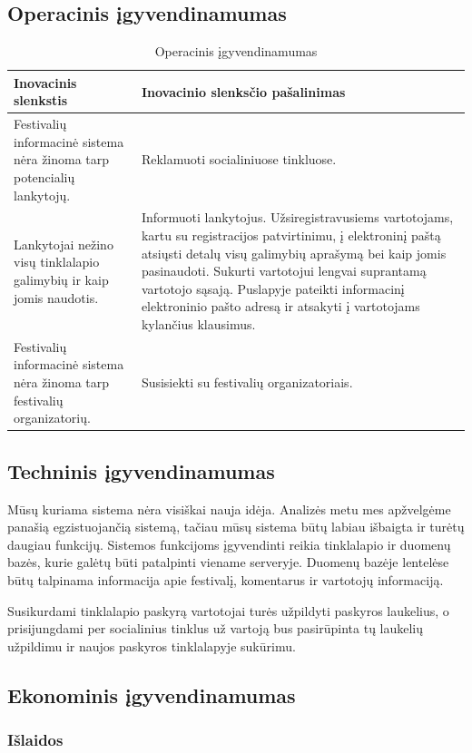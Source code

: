 \documentclass{VUMIFPSkursinis}
\begin{document}
\subsection{Operacinis įgyvendinamumas}
\begin{longtable}{|p{0,45\linewidth}|p{0,45\linewidth}|}
\caption{Operacinis įgyvendinamumas}\\
	\hline
	Inovacinis slenkstis & Inovacinio slenksčio pašalinimas\\
	\hline
	Festivalių informacinė sistema nėra žinoma tarp potencialių lankytojų. &
	Reklamuoti socialiniuose tinkluose.\\
	\hline
	Lankytojai nežino visų tinklalapio galimybių ir kaip jomis naudotis. &
	Informuoti lankytojus. Užsiregistravusiems vartotojams, kartu su registracijos patvirtinimu, į elektroninį paštą atsiųsti detalų visų galimybių aprašymą bei kaip jomis pasinaudoti. Sukurti vartotojui lengvai suprantamą vartotojo sąsają. Puslapyje pateikti informacinį elektroninio pašto adresą ir atsakyti į vartotojams kylančius klausimus.\\
	\hline
	Festivalių informacinė sistema nėra žinoma tarp festivalių organizatorių. & Susisiekti su festivalių organizatoriais.\\
	\hline
\end{longtable}
\subsection{Techninis įgyvendinamumas}
Mūsų kuriama sistema nėra visiškai nauja idėja. Analizės metu mes apžvelgėme panašią egzistuojančią sistemą, tačiau mūsų sistema būtų labiau išbaigta ir turėtų daugiau funkcijų. Sistemos funkcijoms įgyvendinti reikia tinklalapio ir duomenų bazės, kurie galėtų būti patalpinti viename serveryje. Duomenų bazėje lentelėse būtų talpinama informacija apie festivalį, komentarus ir vartotojų informaciją.

Susikurdami tinklalapio paskyrą vartotojai turės užpildyti paskyros laukelius, o prisijungdami per socialinius tinklus už vartoją bus pasirūpinta tų laukelių užpildimu ir naujos paskyros tinklalapyje sukūrimu.
\subsection{Ekonominis įgyvendinamumas}
\subsubsection{Išlaidos}
 
\end{document}
